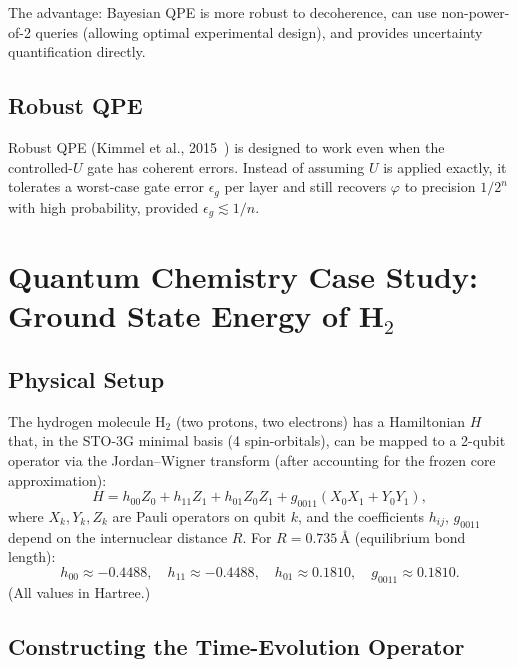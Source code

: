 \documentclass[12pt,a4paper]{article}
\begin{document}
The advantage: Bayesian QPE is more robust to decoherence, can use
non-power-of-2 queries (allowing optimal experimental design), and provides
uncertainty quantification directly.

\subsection{Robust QPE}

Robust QPE (Kimmel et al., 2015~\cite{kimmel2015}) is designed to work
even when the controlled-$U$ gate has coherent errors.  Instead of assuming
$U$ is applied exactly, it tolerates a worst-case gate error $\epsilon_g$
per layer and still recovers $\varphi$ to precision $1/2^n$ with
high probability, provided $\epsilon_g \lesssim 1/n$.

\newpage

\section{Quantum Chemistry Case Study: Ground State Energy of \texorpdfstring{H$_2$}{H2}}
\label{app:h2}

\subsection{Physical Setup}

The hydrogen molecule H$_2$ (two protons, two electrons) has a Hamiltonian
$H$ that, in the STO-3G minimal basis (4 spin-orbitals), can be mapped to
a 2-qubit operator via the Jordan--Wigner transform (after accounting for
the frozen core approximation):
\[
  H = h_{00} Z_0 + h_{11} Z_1 + h_{01} Z_0 Z_1 + g_{0011}(X_0 X_1 + Y_0 Y_1),
\]
where $X_k, Y_k, Z_k$ are Pauli operators on qubit $k$, and the coefficients
$h_{ij}$, $g_{0011}$ depend on the internuclear distance $R$.  For $R = 0.735\,\text{\AA}$
(equilibrium bond length):
\[
  h_{00} \approx -0.4488,\quad h_{11} \approx -0.4488,\quad
  h_{01} \approx 0.1810,\quad g_{0011} \approx 0.1810.
\]
(All values in Hartree.)

\subsection{Constructing the Time-Evolution Operator}
\end{document}
